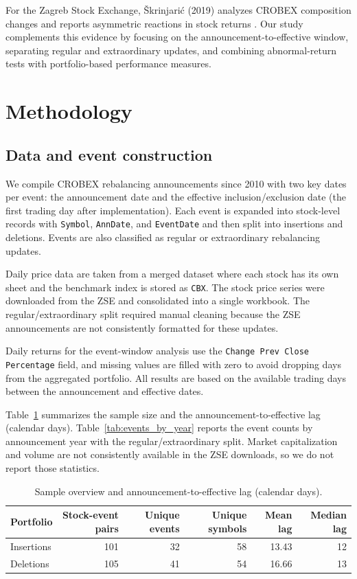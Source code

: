 \documentclass{article}
\begin{document}
For the Zagreb Stock Exchange, \v{S}krinjari\'c (2019) analyzes CROBEX composition changes and reports asymmetric reactions in stock returns \cite{skrinjaric2019}. Our study complements this evidence by focusing on the announcement-to-effective window, separating regular and extraordinary updates, and combining abnormal-return tests with portfolio-based performance measures.

\section{Methodology}
\subsection{Data and event construction}
We compile CROBEX rebalancing announcements since 2010 with two key dates per event: the announcement date and the effective inclusion/exclusion date (the first trading day after implementation). Each event is expanded into stock-level records with \texttt{Symbol}, \texttt{AnnDate}, and \texttt{EventDate} and then split into insertions and deletions. Events are also classified as regular or extraordinary rebalancing updates.



Daily price data are taken from a merged dataset where each stock has its own sheet and the benchmark index is stored as \texttt{CBX}. The stock price series were downloaded from the ZSE and consolidated into a single workbook. The regular/extraordinary split required manual cleaning because the ZSE announcements are not consistently formatted for these updates.

Daily returns for the event-window analysis use the \texttt{Change Prev Close Percentage} field, and missing values are filled with zero to avoid dropping days from the aggregated portfolio. All results are based on the available trading days between the announcement and effective dates.

Table~\ref{tab:data_overview} summarizes the sample size and the announcement-to-effective lag (calendar days). Table~\ref{tab:events_by_year} reports the event counts by announcement year with the regular/extraordinary split. Market capitalization and volume are not consistently available in the ZSE downloads, so we do not report those statistics.

\begin{table}[htbp]
\centering
\caption{Sample overview and announcement-to-effective lag (calendar days).}
\label{tab:data_overview}
\begin{tabular}{lrrrrr}
\toprule
Portfolio & Stock-event pairs & Unique events & Unique symbols & Mean lag & Median lag \\
\midrule
Insertions & 101 & 32 & 58 & 13.43 & 12 \\
Deletions & 105 & 41 & 54 & 16.66 & 13 \\
\bottomrule
\end{tabular}
\end{table}
\end{document}

